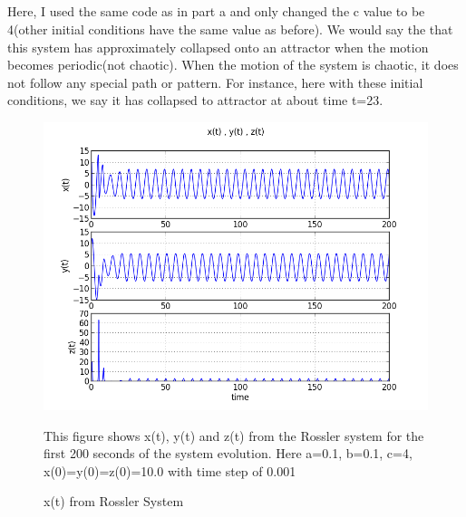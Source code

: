 \documentclass[letterpaper,12pt]{article}
\begin{document}
\subsection{}
Here, I used the same code as in part a and only changed the c value to be 4(other initial conditions have the same value as before).
We would say the that this system has approximately collapsed onto an attractor when the motion becomes periodic(not chaotic). When the motion of the system is chaotic, it does not follow any special path or pattern. For instance, here with these initial conditions, we say it has collapsed to attractor at about time t=23.
\FloatBarrier
\begin{figure}[h~]
\centering
\includegraphics[scale=0.7]{1_b.png}
\caption{x(t) from Rossler System}
This figure shows x(t), y(t) and z(t) from the Rossler system for the first 200 seconds of the system evolution. Here a=0.1, b=0.1, c=4, x(0)=y(0)=z(0)=10.0 with time step of 0.001
\end{figure}
\FloatBarrier

\end{document}
